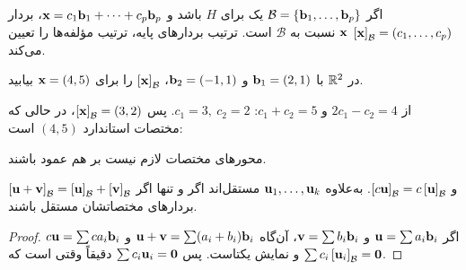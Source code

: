 \begin{definition}
اگر $\mathcal{B}=\{\mathbf{b}_1,\dots,\mathbf{b}_p\}$ یک  برای $H$ باشد و $\mathbf{x}=c_1\mathbf{b}_1+\dots+c_p\mathbf{b}_p$، بردار
$\left[\mathbf{x}\right]_{\mathcal{B}}=(c_1,\dots,c_p)$
 $\mathbf{x}$ نسبت به $\mathcal{B}$ است. ترتیب بردارهای پایه، ترتیب مؤلفه‌ها را تعیین می‌کند.
\end{definition}

\begin{example}
در $\mathbb{R}^2$ با $\mathbf{b}_1=(2,1)$ و $\mathbf{b}_2=(-1,1)$، $\left[\mathbf{x}\right]_{\mathcal{B}}$ را برای $\mathbf{x}=(4,5)$ بیابید.
\end{example}
\begin{solution}
از $2c_1-c_2=4$ و $c_1+c_2=5$: $c_1=3,\ c_2=2$. پس $\left[\mathbf{x}\right]_{\mathcal{B}}=(3,2)$، در حالی که مختصات استاندارد $(4,5)$ است:
\begin{center}
\end{center}
محورهای مختصات لازم نیست بر هم عمود باشند.
\end{solution}

\begin{theorem}\label{thm:coord-map}
$\left[\mathbf{u}+\mathbf{v}\right]_{\mathcal{B}}=\left[\mathbf{u}\right]_{\mathcal{B}}+\left[\mathbf{v}\right]_{\mathcal{B}}$ و $\left[c\mathbf{u}\right]_{\mathcal{B}}=c\left[\mathbf{u}\right]_{\mathcal{B}}$. به‌علاوه $\mathbf{u}_1,\dots,\mathbf{u}_k$ مستقل‌اند اگر و تنها اگر بردارهای مختصاتشان مستقل باشند.
\end{theorem}
\begin{proof}
اگر $\mathbf{u}=\sum a_i\mathbf{b}_i$ و $\mathbf{v}=\sum b_i\mathbf{b}_i$، آن‌گاه $\mathbf{u}+\mathbf{v}=\sum(a_i+b_i)\mathbf{b}_i$ و $c\mathbf{u}=\sum ca_i\mathbf{b}_i$ و نمایش یکتاست. پس $\sum c_i\mathbf{u}_i=\mathbf{0}$ دقیقاً وقتی است که $\sum c_i\left[\mathbf{u}_i\right]_{\mathcal{B}}=\mathbf{0}$.
\end{proof}

